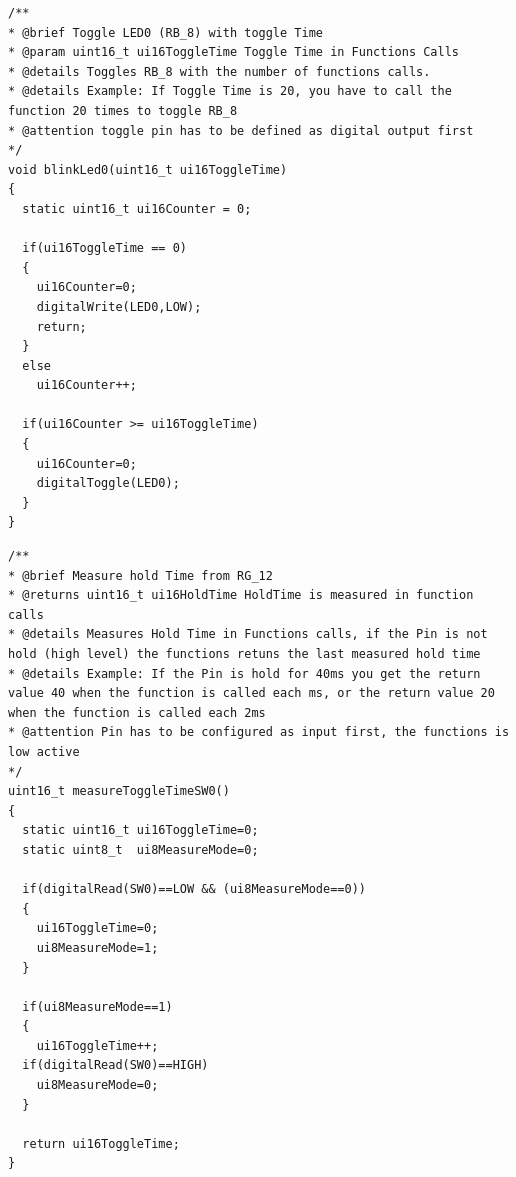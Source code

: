 \newpage
\begin{lstlisting}[frame=htrbl, caption={blinkLed0() Funktion}, label={lst:blinkLed}]
/** 
* @brief Toggle LED0 (RB_8) with toggle Time
* @param uint16_t ui16ToggleTime Toggle Time in Functions Calls
* @details Toggles RB_8 with the number of functions calls.
* @details Example: If Toggle Time is 20, you have to call the function 20 times to toggle RB_8
* @attention toggle pin has to be defined as digital output first
*/
void blinkLed0(uint16_t ui16ToggleTime)
{
  static uint16_t ui16Counter = 0;

  if(ui16ToggleTime == 0)
  {
    ui16Counter=0;
    digitalWrite(LED0,LOW);
    return;
  }
  else
    ui16Counter++;

  if(ui16Counter >= ui16ToggleTime)
  {
    ui16Counter=0;
    digitalToggle(LED0);
  }
}
\end{lstlisting}
\newpage
\begin{lstlisting}[frame=htrbl, caption={measureToggleTimeSW0() Funktion}, label={lst:measuretoggletimesw0}]
/** 
* @brief Measure hold Time from RG_12
* @returns uint16_t ui16HoldTime HoldTime is measured in function calls
* @details Measures Hold Time in Functions calls, if the Pin is not hold (high level) the functions retuns the last measured hold time
* @details Example: If the Pin is hold for 40ms you get the return value 40 when the function is called each ms, or the return value 20 when the function is called each 2ms
* @attention Pin has to be configured as input first, the functions is low active
*/
uint16_t measureToggleTimeSW0()
{
  static uint16_t ui16ToggleTime=0;
  static uint8_t  ui8MeasureMode=0;

  if(digitalRead(SW0)==LOW && (ui8MeasureMode==0))
  {
    ui16ToggleTime=0;
    ui8MeasureMode=1;
  }

  if(ui8MeasureMode==1)
  {
    ui16ToggleTime++;
  if(digitalRead(SW0)==HIGH)
    ui8MeasureMode=0;
  }

  return ui16ToggleTime;
}
\end{lstlisting}

